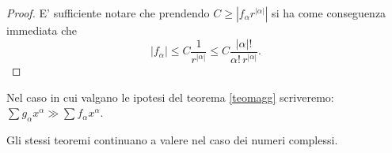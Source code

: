\begin{theorem}\label{teomagg}
\end{theorem}


\begin{theorem}
\end{theorem}

\begin{proof}
E' sufficiente notare che prendendo $C \geq |f_\alpha r^{|\alpha |}|$ si ha come conseguenza immediata che
$$|f_\alpha | \leq C \frac{1}{r^{|\alpha |}} \leq C \frac{|\alpha |!}{\alpha ! \, r^{|\alpha |}}.$$
\end{proof}

Nel caso in cui valgano le ipotesi del teorema \ref{teomagg} scriveremo:  $\sum g_\alpha x^\alpha \gg \sum f_\alpha x^\alpha$.

\begin{remark}
Gli stessi teoremi continuano a valere nel caso dei numeri complessi.
\end{remark}

